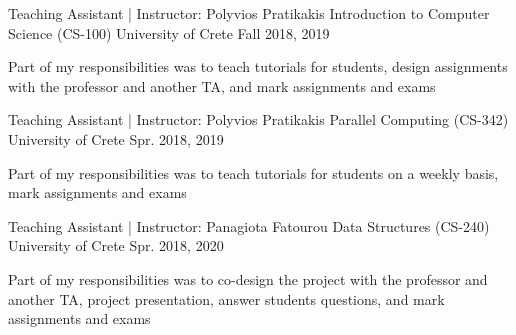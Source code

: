 


\begin{cventries}

  \cventry
    {Teaching Assistant | Instructor: Polyvios Pratikakis} %
    {Introduction to Computer Science (CS-100)} %
    {University of Crete} %
    {Fall 2018, 2019} %
    {
      \begin{cvitems} %
        \item{Part of my responsibilities was to teach tutorials for
            students, design assignments with the professor and
              another TA, and mark assignments and exams}
      \end{cvitems}
    }

  \cventry
    {Teaching Assistant | Instructor: Polyvios Pratikakis} %
    {Parallel Computing (CS-342)} %
    {University of Crete} %
    {Spr. 2018, 2019} %
    {
      \begin{cvitems} %
        \item{Part of my responsibilities was to teach tutorials for
            students on a weekly basis, mark assignments and exams}
      \end{cvitems}
    }

  \cventry
    {Teaching Assistant | Instructor: Panagiota Fatourou} %
    {Data Structures (CS-240)} %
    {University of Crete} %
    {Spr. 2018, 2020} %
    {
      \begin{cvitems} %
        \item{Part of my responsibilities was to co-design the project
            with the professor and another TA, project presentation,
              answer students questions, and mark assignments and
              exams}
      \end{cvitems}
    }


\end{cventries}
